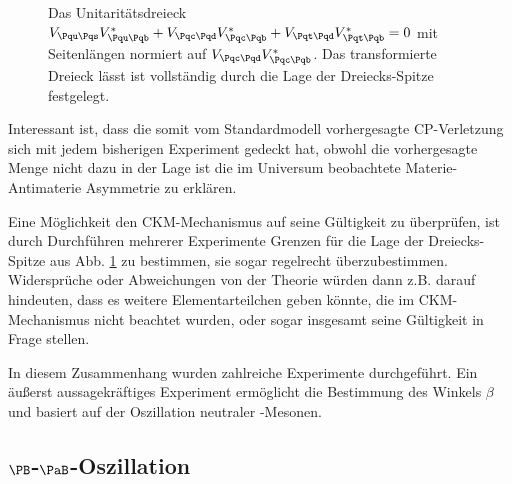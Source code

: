 \begin{figure}
  \centering
  \caption{Das Unitaritätsdreieck $\Vud\Vub^* + \Vcd\Vcb^* + \Vtd\Vtb^* = 0$ mit Seitenlängen normiert auf $\Vcd\Vcb^*$. Das transformierte Dreieck lässt ist vollständig durch die Lage der Dreiecks-Spitze festgelegt.}
  \label{unitarity-triangle}
\end{figure}

Interessant ist, dass die somit vom Standardmodell vorhergesagte CP-Verletzung sich mit jedem bisherigen Experiment gedeckt hat, obwohl die vorhergesagte Menge nicht dazu in der Lage ist die im Universum beobachtete Materie-Antimaterie Asymmetrie zu erklären.

Eine Möglichkeit den CKM-Mechanismus auf seine Gültigkeit zu überprüfen, ist durch Durchführen mehrerer Experimente Grenzen für die Lage der Dreiecks-Spitze aus Abb. \ref{unitarity-triangle} zu bestimmen, sie sogar regelrecht überzubestimmen.
Widersprüche oder Abweichungen von der Theorie würden dann z.B. darauf hindeuten, dass es weitere Elementarteilchen geben könnte, die im CKM-Mechanismus nicht beachtet wurden, oder sogar insgesamt seine Gültigkeit in Frage stellen.

In diesem Zusammenhang wurden zahlreiche Experimente durchgeführt.
Ein äußerst aussagekräftiges Experiment ermöglicht die Bestimmung des Winkels $β$ und basiert auf der Oszillation neutraler \PB-Mesonen.

\subsection{$\PB$-$\PaB$-Oszillation}

